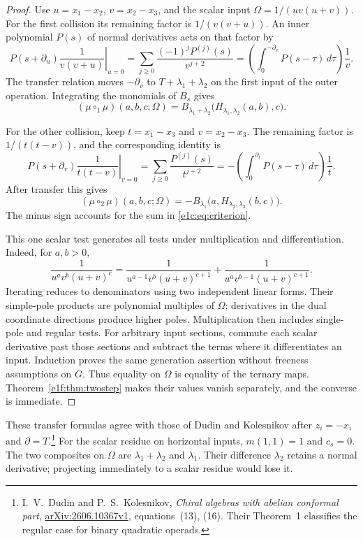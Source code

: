 \begin{proof}
Use\label{e1c:def:ternary-scalar-test} \(u=x_1-x_2\), \(v=x_2-x_3\), and the scalar input
\(\Omega=1/(uv(u+v))\). For the first collision its remaining
factor is \(1/(v(v+u))\). An inner polynomial \(P(s)\)
of normal derivatives acts on that factor by
\[
 \left.P(s+\partial_u)\frac1{v(v+u)}\right|_{u=0}
 =\sum_{j\geq0}\frac{(-1)^jP^{(j)}(s)}{v^{j+2}}
 =\left(\int_0^{-\partial_v}P(s-\tau)\,d\tau\right)\frac1v.
\]
The transfer relation moves \(-\partial_v\) to
\(T+\lambda_1+\lambda_2\) on the first input of the outer
operation. Integrating the monomials of \(B_s\) gives
\[
 (\mu\circ_1\mu)(a,b,c;\Omega)
 =B_{\lambda_1+\lambda_2}
             \bigl(H_{\lambda_1,\lambda_2}(a,b),c\bigr).
\]

For the other collision, keep \(t=x_1-x_3\) and
\(v=x_2-x_3\). The remaining factor is \(1/(t(t-v))\),
and the corresponding identity is
\[
 \left.P(s+\partial_v)\frac1{t(t-v)}\right|_{v=0}
 =\sum_{j\geq0}\frac{P^{(j)}(s)}{t^{j+2}}
 =-\left(\int_0^{\partial_t}P(s-\tau)\,d\tau\right)\frac1t.
\]
After transfer this gives
\[
 (\mu\circ_2\mu)(a,b,c;\Omega)
 =-B_{\lambda_1}\bigl(a,H_{\lambda_2,\lambda_3}(b,c)\bigr).
\]
The minus sign accounts for the sum in
\eqref{e1c:eq:criterion}.

This one scalar test generates all tests under multiplication
and differentiation. Indeed, for \(a,b>0\),
\[
 \frac1{u^av^b(u+v)^c}
 =\frac1{u^{a-1}v^b(u+v)^{c+1}}
  +\frac1{u^av^{b-1}(u+v)^{c+1}}.
\]
Iterating reduces to denominators using two independent linear
forms. Their simple-pole products are polynomial multiples of
\(\Omega\); derivatives in the dual coordinate directions
produce higher poles. Multiplication then includes single-pole
and regular tests. For arbitrary input sections, commute each
scalar derivative past those sections and subtract the terms
where it differentiates an input. Induction proves the same
generation assertion without freeness assumptions on \(G\).
Thus equality on \(\Omega\) is equality of the ternary maps.
Theorem~\ref{e1f:thm:twostep} makes their values vanish
separately, and the converse is immediate.
\end{proof}

These transfer formulas agree with those of Dudin and
Kolesnikov after \(z_i=-x_i\) and \(\partial=T\).\footnote{
I.~V.~Dudin and P.~S.~Kolesnikov, \emph{Chiral algebras with
abelian conformal part},
\href{https://arxiv.org/abs/2606.10367}{arXiv:2606.10367v1},
equations~(13), (16). Their Theorem~1 classifies the regular
case for binary quadratic operads.}
For the scalar residue on horizontal inputs,
\(m(1,1)=1\) and \(c_s=0\). The two composites on
\(\Omega\) are \(\lambda_1+\lambda_2\) and \(\lambda_1\).
Their difference \(\lambda_2\) retains a normal derivative;
projecting immediately to a scalar residue would lose it.

